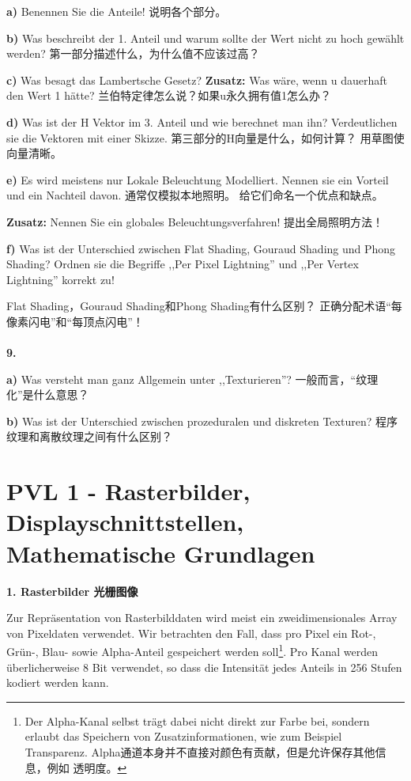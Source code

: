 \documentclass[fleqn]{article}
\begin{document}
\indent\textbf{a)} Benennen Sie die Anteile! 说明各个部分。

\indent\textbf{b)} Was beschreibt der 1. Anteil und warum sollte der Wert nicht zu hoch gewählt werden?
第一部分描述什么，为什么值不应该过高？

\indent\textbf{c)} Was besagt das Lambertsche Gesetz? \textbf{Zusatz:} Was wäre, wenn u dauerhaft den Wert 1 hätte?
兰伯特定律怎么说？如果u永久拥有值1怎么办？

\indent\textbf{d)} Was ist der H Vektor im 3. Anteil und wie berechnet man ihn? Verdeutlichen sie die Vektoren mit einer Skizze.
第三部分的H向量是什么，如何计算？ 用草图使向量清晰。

\indent\textbf{e)} Es wird meistens nur Lokale Beleuchtung Modelliert. Nennen sie ein Vorteil und ein Nachteil davon. 
通常仅模拟本地照明。 给它们命名一个优点和缺点。

\indent\indent\textbf{Zusatz:} Nennen Sie ein globales Beleuchtungsverfahren!
提出全局照明方法！

\indent\textbf{f)} Was ist der Unterschied zwischen Flat Shading, Gouraud Shading und Phong Shading? Ordnen sie die Begriffe ,,Per Pixel Lightning'' und ,,Per Vertex Lightning'' korrekt zu!

Flat Shading，Gouraud Shading和Phong Shading有什么区别？ 正确分配术语“每像素闪电”和“每顶点闪电”！
\\
\\
\noindent\textbf{9. }

\indent\textbf{a)} Was versteht man ganz Allgemein unter ,,Texturieren''? 一般而言，“纹理化”是什么意思？

\indent\textbf{b)} Was ist der Unterschied zwischen prozeduralen und diskreten Texturen? 程序纹理和离散纹理之间有什么区别？

\newpage

\section{PVL 1 - Rasterbilder, Displayschnittstellen, Mathematische Grundlagen}

\noindent\textbf{1. Rasterbilder 光栅图像}

Zur Repräsentation von Rasterbilddaten wird meist ein zweidimensionales Array von Pixeldaten verwendet. Wir betrachten den Fall, dass pro Pixel ein Rot-, Grün-, Blau- sowie Alpha-Anteil gespeichert werden soll\footnote{Der Alpha-Kanal selbst trägt dabei nicht direkt zur Farbe bei, sondern erlaubt das Speichern von Zusatzinformationen, wie zum Beispiel Transparenz. Alpha通道本身并不直接对颜色有贡献，但是允许保存其他信息，例如 透明度。}. Pro Kanal werden überlicherweise 8 Bit verwendet, so dass die Intensität jedes Anteils in 256 Stufen kodiert werden kann.
\end{document}
